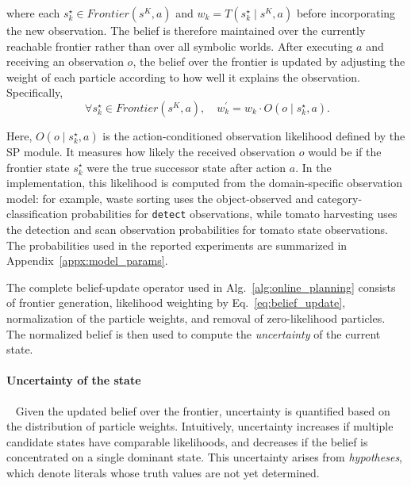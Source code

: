 where each $s_k^{\star} \in Frontier(s^{K}, a)$ and $w_k = T(s_k^\star \mid s^K,a)$ before incorporating the new observation.
The belief is therefore maintained over the currently reachable frontier rather than over all symbolic worlds.
After executing $a$ and receiving an observation $o$, the belief over the frontier is updated by adjusting the weight of each particle according to how well it explains the observation. Specifically, 
\begin{equation}~\label{eq:belief_update}
\forall s_k^{\star} \in Frontier(s^{K}, a), \quad
w_k^\prime = w_k \cdot O(o \mid s_k^{\star}, a).\end{equation}

Here, $O(o \mid s_k^{\star}, a)$ is the action-conditioned observation likelihood defined by the SP module. It measures how likely the received observation $o$ would be if the frontier state $s_k^{\star}$ were the true successor state after action $a$. In the implementation, this likelihood is computed from the domain-specific observation model: for example, waste sorting uses the object-observed and category-classification probabilities for \texttt{detect} observations, while tomato harvesting uses the detection and scan observation probabilities for tomato state observations. The probabilities used in the reported experiments are summarized in Appendix~\ref{appx:model_params}.

The complete belief-update operator used in Alg.~\ref{alg:online_planning} consists of frontier generation, likelihood weighting by Eq.~\ref{eq:belief_update}, normalization of the particle weights, and removal of zero-likelihood particles. The normalized belief is then used to compute the \textit{uncertainty} of the current state.


\paragraph{Uncertainty of the state}~\label{method:uncertainty}
Given the updated belief over the frontier, uncertainty is quantified based on the distribution of particle weights. Intuitively, uncertainty increases if multiple candidate states have comparable likelihoods, and decreases if the belief is concentrated on a single dominant state. This uncertainty arises from \textit{hypotheses}, which denote literals whose truth values are not yet determined.

